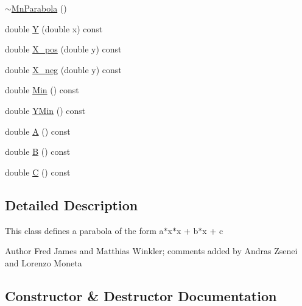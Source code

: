 \begin{DoxyCompactItemize}
\item 
\mbox{\hyperlink{classROOT_1_1Minuit2_1_1MnParabola_ae5d6b58d6c4f02ad9b34bb397157f9e2}{$\sim$\+Mn\+Parabola}} ()
\item 
double \mbox{\hyperlink{classROOT_1_1Minuit2_1_1MnParabola_af429c12e92f120e38f75147fd3fc857c}{Y}} (double x) const
\item 
double \mbox{\hyperlink{classROOT_1_1Minuit2_1_1MnParabola_a2b4623df00488ca3d4175eb92123066e}{X\+\_\+pos}} (double y) const
\item 
double \mbox{\hyperlink{classROOT_1_1Minuit2_1_1MnParabola_a16f7f02dd1cb070e89fb007331066ee3}{X\+\_\+neg}} (double y) const
\item 
double \mbox{\hyperlink{classROOT_1_1Minuit2_1_1MnParabola_ab3c7e51f6276d9ebf6d28fe965914bc8}{Min}} () const
\item 
double \mbox{\hyperlink{classROOT_1_1Minuit2_1_1MnParabola_a7efab0e0a9902151738605a552adef41}{Y\+Min}} () const
\item 
double \mbox{\hyperlink{classROOT_1_1Minuit2_1_1MnParabola_ae5ca4bea19ba4c0243ca70bb6e55e827}{A}} () const
\item 
double \mbox{\hyperlink{classROOT_1_1Minuit2_1_1MnParabola_a878824850afd7ec98fd8685bec89784b}{B}} () const
\item 
double \mbox{\hyperlink{classROOT_1_1Minuit2_1_1MnParabola_a9ca632ea018da194e08eb18d4b0059f9}{C}} () const
\end{DoxyCompactItemize}


\subsection{Detailed Description}
This class defines a parabola of the form a$\ast$x$\ast$x + b$\ast$x + c

\begin{DoxyAuthor}{Author}
Fred James and Matthias Winkler; comments added by Andras Zsenei and Lorenzo Moneta 
\end{DoxyAuthor}


\subsection{Constructor \& Destructor Documentation}
\mbox{\label{classROOT_1_1Minuit2_1_1MnParabola_ae6e3ffd6c7a3d586d8c72ae35ead4448}} 
